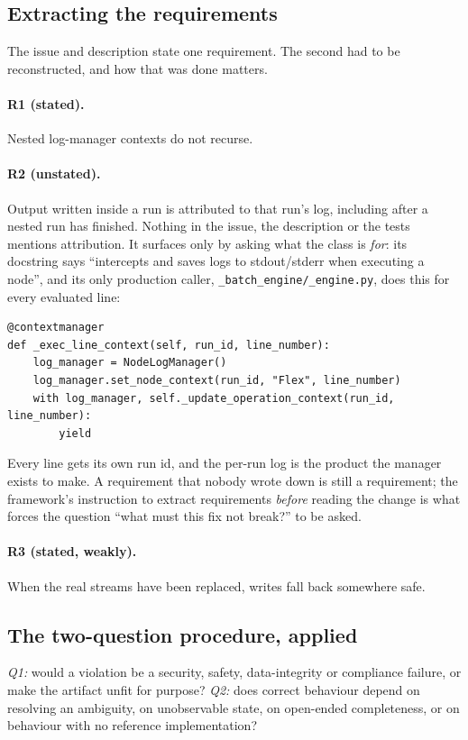 \documentclass[11pt,a4paper]{article}
\newcommand{\code}[1]{\texttt{#1}}
\begin{document}
\subsection{Extracting the requirements}
The issue and description state one requirement. The second had to be reconstructed, and how that was done matters.

\paragraph{R1 (stated).} Nested log-manager contexts do not recurse.

\paragraph{R2 (unstated).} Output written inside a run is attributed to that run's log, including after a nested run has finished. Nothing in the issue, the description or the tests mentions attribution. It surfaces only by asking what the class is \emph{for}: its docstring says ``intercepts and saves logs to stdout/stderr when executing a node'', and its only production caller, \code{\_batch\_engine/\_engine.py}, does this for every evaluated line:
\begin{lstlisting}
@contextmanager
def _exec_line_context(self, run_id, line_number):
    log_manager = NodeLogManager()
    log_manager.set_node_context(run_id, "Flex", line_number)
    with log_manager, self._update_operation_context(run_id, line_number):
        yield
\end{lstlisting}
Every line gets its own run id, and the per-run log is the product the manager exists to make. A requirement that nobody wrote down is still a requirement; the framework's instruction to extract requirements \emph{before} reading the change is what forces the question ``what must this fix not break?'' to be asked.

\paragraph{R3 (stated, weakly).} When the real streams have been replaced, writes fall back somewhere safe.

\subsection{The two-question procedure, applied}
\emph{Q1:} would a violation be a security, safety, data-integrity or compliance failure, or make the artifact unfit for purpose? \emph{Q2:} does correct behaviour depend on resolving an ambiguity, on unobservable state, on open-ended completeness, or on behaviour with no reference implementation?
\end{document}

